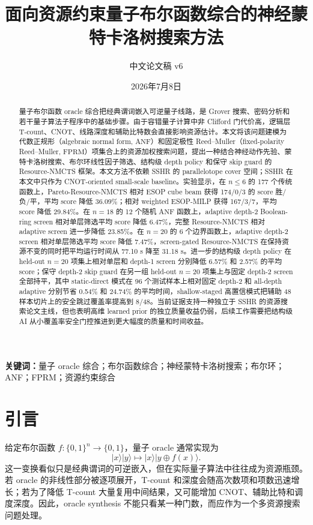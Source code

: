 \documentclass[UTF8,fontset=macnew,11pt]{ctexart}
\title{面向资源约束量子布尔函数综合的神经蒙特卡洛树搜索方法}
\author{中文论文稿 v6}
\date{2026年7月8日}
\newcommand{\method}{Resource-NMCTS}
\newcommand{\pareto}{Pareto-Resource-NMCTS}
\newcommand{\screen}{Boolean-ring screen}
\newcommand{\anf}{\ensuremath{\mathrm{ANF}}}
\newcommand{\fprm}{\ensuremath{\mathrm{FPRM}}}
\newcommand{\xor}{\ensuremath{\oplus}}
\begin{document}
\pagestyle{plain}
\maketitle

\begin{abstract}
量子布尔函数 oracle 综合把经典谓词嵌入可逆量子线路，是 Grover 搜索、密码分析和若干量子算法子程序中的基础步骤。由于容错量子计算中非 Clifford 门代价高，逻辑层 T-count、CNOT、线路深度和辅助比特数会直接影响资源估计。本文将该问题建模为代数正规形（algebraic normal form, \anf{}）和固定极性 Reed--Muller（fixed-polarity Reed--Muller, \fprm{}）项集合上的资源加权搜索问题，提出一种结合神经动作先验、蒙特卡洛树搜索、布尔环线性因子筛选、结构级 depth policy 和保守 skip guard 的 \method{} 框架。本文方法不依赖 SSHR 的 parallelotope cover 空间；SSHR 在本文中只作为 CNOT-oriented small-scale baseline。实验显示，在 $n\leq6$ 的 177 个传统函数上，\pareto{} 相对 ESOP cube beam 获得 174/0/3 的 score 胜/负/平，平均 score 降低 36.09\%；相对 weighted ESOP-MILP 获得 167/3/7，平均 score 降低 29.84\%。在 $n=18$ 的 12 个随机 \anf{} 函数上，adaptive depth-2 \screen{} 相对单层筛选平均 score 降低 6.47\%，完整 \method{} 相对 adaptive screen 进一步降低 23.85\%。在 $n=20$ 的 6 个边界函数上，adaptive depth-2 screen 相对单层筛选平均 score 降低 7.47\%，screen-gated \method{} 在保持资源不变的同时把平均运行时间从 77.10 s 降至 31.18 s。进一步的结构级 depth policy 在 held-out $n=20$ 项集上相对单层和 depth-1 screen 分别降低 6.57\% 和 2.57\% 的平均 score；保守 depth-2 skip guard 在另一组 held-out $n=20$ 项集上与固定 depth-2 screen 全部持平，其中 static-direct 模式在 96 个测试样本上相对固定 depth-2 和 all-depth adaptive 分别节省 0.54\% 和 24.74\% 的平均时间，shallow-staged 高置信模式把辅助 48 样本切片上的安全跳过覆盖率提高到 8/48。当前证据支持一种独立于 SSHR 的资源搜索论文主线，但也表明高维 learned prior 的独立质量收益仍弱，后续工作需要把结构级 AI 从小覆盖率安全门控推进到更大幅度的质量和时间收益。
\end{abstract}

\noindent\textbf{关键词：}量子 oracle 综合；布尔函数综合；神经蒙特卡洛树搜索；布尔环；ANF；FPRM；资源约束综合

\section{引言}

给定布尔函数 $f:\{0,1\}^n\rightarrow\{0,1\}$，量子 oracle 通常实现为
\begin{equation}
  |x\rangle |y\rangle \mapsto |x\rangle |y\xor f(x)\rangle .
  \label{eq:oracle}
\end{equation}
这一变换看似只是经典谓词的可逆嵌入，但在实际量子算法中往往成为资源瓶颈。若 oracle 的非线性部分被逐项展开，T-count 和深度会随高次数项和项数迅速增长；若为了降低 T-count 大量复用中间结果，又可能增加 CNOT、辅助比特和调度深度。因此，oracle synthesis 不能只看某一种门数，而应作为一个多资源搜索问题处理。
\end{document}
